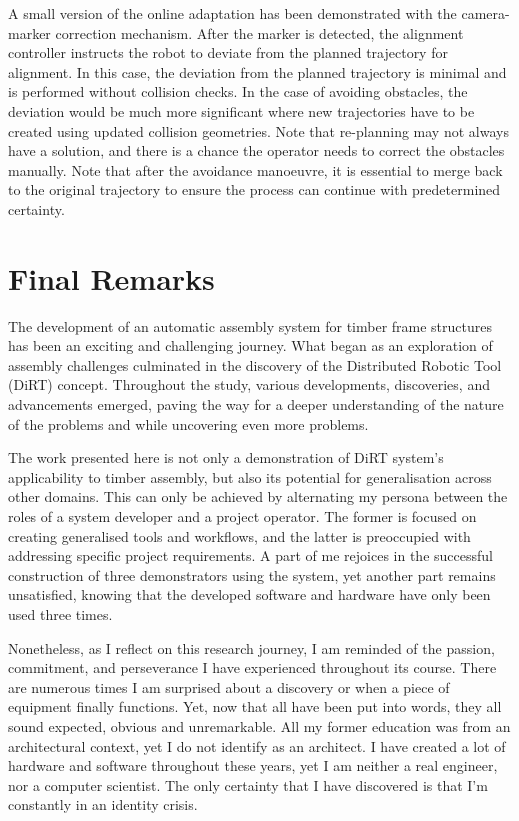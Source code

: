 A small version of the online adaptation has been demonstrated with the camera-marker correction mechanism. After the marker is detected, the alignment controller instructs the robot to deviate from the planned trajectory for alignment. In this case, the deviation from the planned trajectory is minimal and is performed without collision checks. In the case of avoiding obstacles, the deviation would be much more significant where new trajectories have to be created using updated collision geometries. Note that re-planning may not always have a solution, and there is a chance the operator needs to correct the obstacles manually. Note that after the avoidance manoeuvre, it is essential to merge back to the original trajectory to ensure the process can continue with predetermined certainty.

\section{Final Remarks}
\label{section:final-remarks}

The development of an automatic assembly system for timber frame structures has been an exciting and challenging journey. What began as an exploration of assembly challenges culminated in the discovery of the Distributed Robotic Tool (DiRT) concept. Throughout the study, various developments, discoveries, and advancements emerged, paving the way for a deeper understanding of the nature of the problems and while uncovering even more problems.

The work presented here is not only a demonstration of DiRT system's applicability to timber assembly, but also its potential for generalisation across other domains. This can only be achieved by alternating my persona between the roles of a system developer and a project operator. The former is focused on creating generalised tools and workflows, and the latter is preoccupied with addressing specific project requirements. A part of me rejoices in the successful construction of three demonstrators using the system, yet another part remains unsatisfied, knowing that the developed software and hardware have only been used three times.

Nonetheless, as I reflect on this research journey, I am reminded of the passion, commitment, and perseverance I have experienced throughout its course. There are numerous times I am surprised about a discovery or when a piece of equipment finally functions. Yet, now that all have been put into words, they all sound expected, obvious and unremarkable. All my former education was from an architectural context, yet I do not identify as an architect. I have created a lot of hardware and software throughout these years, yet I am neither a real engineer, nor a computer scientist. The only certainty that I have discovered is that I’m constantly in an identity crisis. 


